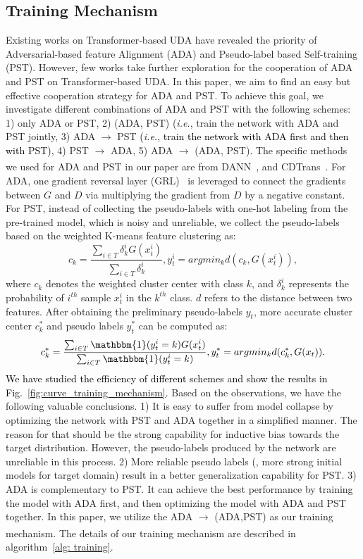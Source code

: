 \documentclass[journal]{IEEEtran}
\newcommand{\tcb}{\textcolor{black}}
\begin{document}
\subsection{Training Mechanism}
Existing works on Transformer-based UDA have revealed the  priority of Adversarial-based feature Alignment (ADA) and Pseudo-label based Self-training (PST). However, few works take further exploration for the cooperation of ADA and PST on Transformer-based UDA. In this paper, we aim to find an easy but effective cooperation strategy for ADA and PST. To achieve this goal, we investigate different combinations of ADA and PST with the following schemes: 1) only ADA or PST, 2) (ADA, PST) (\textit{i.e.}, train the network with ADA and PST jointly, 3) ADA $\xrightarrow{}$ PST \tcb{(\textit{i.e.}, train the network with ADA first and then with PST)}, 4) PST $\xrightarrow[]{}$ ADA, 5) ADA $\xrightarrow[]{}$ (ADA, PST). The specific methods we used for ADA and PST in our paper are from DANN~\cite{ganin2016domain_dann, sun2022safeSSRT}, and CDTrans~\cite{xu2021cdtransCDTrans}. For ADA, one gradient reversal layer (GRL)~\cite{ganin2016domain_dann} is leveraged to connect the gradients between $G$ and $D$ via multiplying the gradient from $D$ by a negative constant. For PST, instead of collecting the pseudo-labels with one-hot labeling from the pre-trained model, which is noisy and unreliable, we collect the pseudo-labels based on the weighted K-means feature clustering as:
\begin{equation}
    c_k = \frac{\sum_{i\in T}\delta_k^i G(x_t^i)}{\sum_{i \in T}\delta_k^i}, y_t^i = argmin_k d(c_k, G(x_t^i)),
\end{equation}
where $c_k$ denotes the weighted cluster center with class $k$, and $\delta_k^i$ represents the probability of $i^{th}$ sample $x_t^i$ in the $k^{th}$ class. $d$ refers to the distance between two features. After obtaining the preliminary pseudo-labels $y_t$, more accurate cluster center $c_k^*$ and pseudo labels $y_t^*$ can be computed as:
\begin{equation}
    c_k^* = \frac{\sum_{i\in T} {\mathbbm{1}} (y_t^i=k) G(x_t^i)}{\sum_{i\in T} \mathbbm{1} (y_t^i=k) }, y_t^* = argmin_k d(c_k^*, G(x_t)).
\end{equation}
\tcb{We have studied the efficiency of different schemes and show the results in Fig.~\ref{fig:curve_training_mechanism}.} Based on the observations, we have the following valuable conclusions. 1) It is easy to suffer from model collapse by optimizing the network with PST and ADA together in a simplified manner. The reason for that should be the strong capability for inductive bias towards the target distribution. However, the pseudo-labels produced by the network are unreliable in this process.
2) More reliable pseudo labels (\ieno, more strong initial models for target domain) result in a better generalization capability for PST.
3) ADA is complementary to PST. It can achieve the best performance by training the model with ADA first, and then optimizing the model with ADA and PST together. 
In this paper, we utilize the ADA $\xrightarrow[]{}$ (ADA,PST) as our training mechanism. The details of our training mechanism are described in algorithm~\ref{alg: training}.
\end{document}
